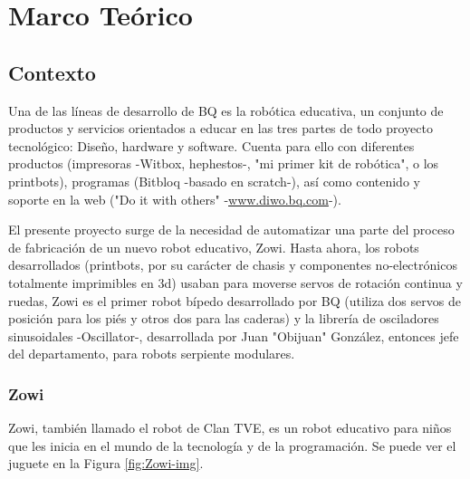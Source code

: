 
\chapter{Marco Teórico} %

\label{Chapter2} %


\section{Contexto}

Una de las líneas de desarrollo de BQ es la robótica educativa, un conjunto de productos y servicios orientados a educar en las tres partes de todo proyecto tecnológico: Diseño, hardware y software. Cuenta para ello con diferentes productos (impresoras -Witbox, hephestos-, "mi primer kit de robótica", o los printbots), programas (Bitbloq -basado en scratch-), así como contenido y soporte en la web ("Do it with others" -\url{www.diwo.bq.com}-).

El presente proyecto surge de la necesidad de automatizar una parte del proceso de fabricación de un nuevo robot educativo, Zowi. Hasta ahora, los robots desarrollados (printbots, por su carácter de chasis y componentes no-electrónicos totalmente imprimibles en 3d) usaban para moverse servos de rotación continua y ruedas, Zowi es el primer robot bípedo desarrollado por BQ (utiliza dos servos de posición para los piés y otros dos para las caderas) y la librería de osciladores sinusoidales -Oscillator-, desarrollada por Juan "Obijuan" González, entonces jefe del departamento, para robots serpiente modulares.

\subsection{Zowi}
Zowi, también llamado el robot de Clan TVE, es un robot educativo para niños que les inicia en el mundo de la tecnología y de la programación. Se puede ver el juguete en la Figura \ref{fig:Zowi-img}.

